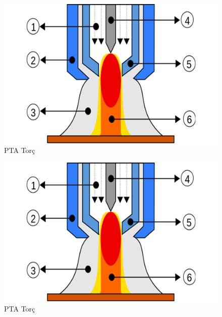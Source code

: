 \begin{figure}[htp]
\includegraphics[width=\textwidth]{gorseller/ptaTorc}
\caption{PTA Torç}\label{fig:PtaTorc5}
\end{figure}
\begin{figure}[htp]
\includegraphics[width=\textwidth]{gorseller/ptaTorc}
\caption{PTA Torç}\label{fig:PtaTorc6}
\end{figure}
